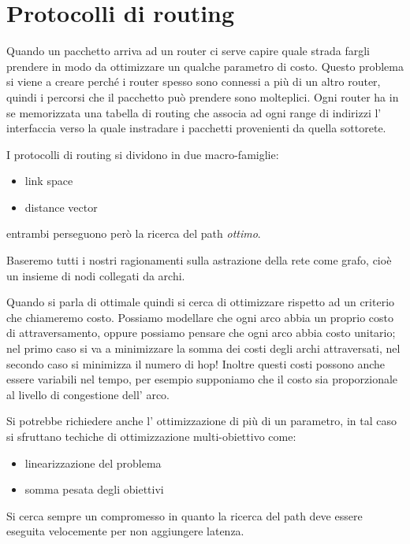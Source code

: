 \section{Protocolli di routing}
Quando un pacchetto arriva ad un router ci serve capire quale strada fargli prendere in modo da ottimizzare un qualche parametro di costo.
Questo problema si viene a creare perché i router spesso sono connessi a più di un altro router, quindi i percorsi che il pacchetto può prendere sono molteplici.
Ogni router ha in se memorizzata una tabella di routing che associa ad ogni range di indirizzi l' interfaccia verso la quale instradare i pacchetti provenienti da quella sottorete.

I protocolli di routing si dividono in due macro-famiglie:
\begin{itemize}
    \item link space
    \item distance vector
\end{itemize}
entrambi perseguono però la ricerca del path \emph{ottimo}.

Baseremo tutti i nostri ragionamenti sulla astrazione della rete come grafo, cioè un insieme di nodi collegati da archi.

Quando si parla di ottimale quindi si cerca di ottimizzare rispetto ad un criterio che chiameremo costo.
Possiamo modellare che ogni arco abbia un proprio costo di attraversamento, oppure possiamo pensare che ogni arco abbia costo unitario; nel primo caso si va a minimizzare la somma dei costi degli archi attraversati, nel secondo caso si minimizza il numero di hop!
Inoltre questi costi possono anche essere variabili nel tempo, per esempio supponiamo che il costo sia proporzionale al livello di congestione dell' arco.

Si potrebbe richiedere anche l' ottimizzazione di più di un parametro, in tal caso si sfruttano techiche di ottimizzazione multi-obiettivo come:
\begin{itemize}
    \item linearizzazione del problema
    \item somma pesata degli obiettivi
\end{itemize}

Si cerca sempre un compromesso in quanto la ricerca del path deve essere eseguita velocemente per non aggiungere latenza.

